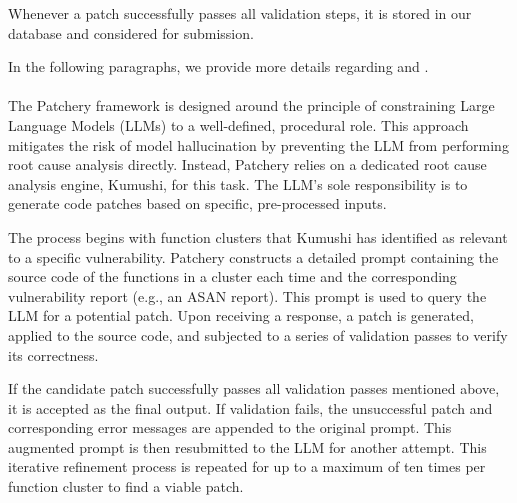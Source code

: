 Whenever a patch successfully passes all validation steps, it is stored in our database and considered for submission.

In the following paragraphs, we provide more details regarding \patchery and \patcherq.

\paragraph{\patchery}

The Patchery framework is designed around the principle of constraining Large Language Models (LLMs) to a well-defined, procedural role. This approach mitigates the risk of model hallucination by preventing the LLM from performing root cause analysis directly. Instead, Patchery relies on a dedicated root cause analysis engine, Kumushi, for this task. The LLM's sole responsibility is to generate code patches based on specific, pre-processed inputs.

The process begins with function clusters that Kumushi has identified as relevant to a specific vulnerability. Patchery constructs a detailed prompt containing the source code of the functions in a cluster each time and the corresponding vulnerability report (e.g., an ASAN report). This prompt is used to query the LLM for a potential patch. Upon receiving a response, a patch is generated, applied to the source code, and subjected to a series of validation passes to verify its correctness.

If the candidate patch successfully passes all validation passes mentioned above, it is accepted as the final output. If validation fails, the unsuccessful patch and corresponding error messages are appended to the original prompt. This augmented prompt is then resubmitted to the LLM for another attempt. This iterative refinement process is repeated for up to a maximum of ten times per function cluster to find a viable patch.


\paragraph{\patcherq}


